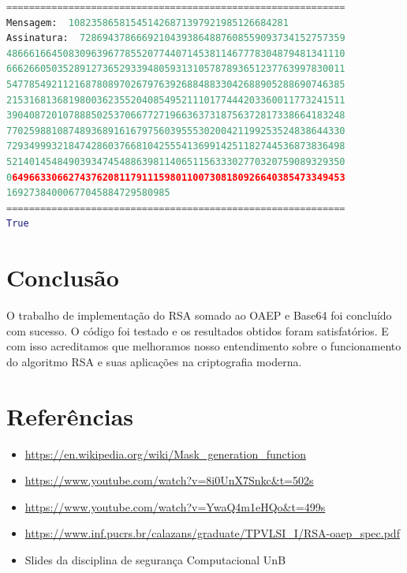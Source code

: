 \documentclass{article}
\begin{document}
\begin{lstlisting}[language=Python, breaklines=true]
============================================================
Mensagem:  108235865815451426871397921985126684281 
Assinatura:  72869437866692104393864887608559093734152757359
486661664508309639677855207744071453811467778304879481341110
666266050352891273652933948059313105787893651237763997830011
547785492112168780897026797639268848833042688905288690746385
215316813681980036235520408549521110177444203360011773241511
390408720107888502537066772719663637318756372817338664183248
770259881087489368916167975603955530200421199253524838644330
729349993218474286037668104255541369914251182744536873836498
521401454849039347454886398114065115633302770320759089329350
064966330662743762081179111598011007308180926640385473349453
16927384000677045884729580985
============================================================
True

\end{lstlisting}

\section{Conclusão}
O trabalho de implementação do RSA somado ao OAEP e Base64 foi concluído com sucesso. O código foi testado e os resultados obtidos foram satisfatórios.
E com isso acreditamos que melhoramos nosso entendimento sobre o funcionamento do algoritmo RSA e suas aplicações na criptografia moderna.

\section{Referências}
\begin{itemize}
    \item \url{https://en.wikipedia.org/wiki/Mask_generation_function}
    \item \url{https://www.youtube.com/watch?v=8i0UnX7Snkc&t=502s}
    \item \url{https://www.youtube.com/watch?v=YwaQ4m1eHQo&t=499s}
    \item \url{https://www.inf.pucrs.br/calazans/graduate/TPVLSI_I/RSA-oaep_spec.pdf}
    \item Slides da disciplina de segurança Computacional UnB 
\end{itemize}    
\end{document}
